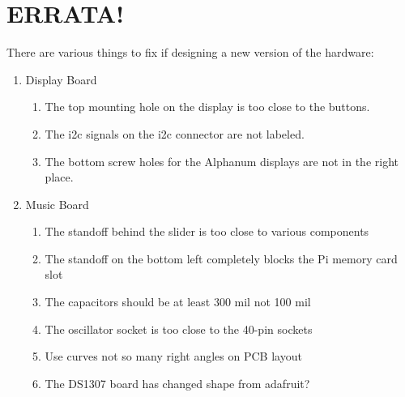 \documentclass[11pt]{article}
\begin{document}
\section{ERRATA!}

There are various things to fix if designing a new version of the
hardware:
\begin{enumerate}
\item Display Board
	\begin{enumerate}
	\item The top mounting hole on the display is too close to the buttons.
	\item The i2c signals on the i2c connector are not labeled.
	\item The bottom screw holes for the Alphanum displays are not in
		the right place.
	\end{enumerate}
\item Music Board
	\begin{enumerate}
	\item The standoff behind the slider is too close to various components
	\item The standoff on the bottom left completely blocks the Pi
		memory card slot
	\item The capacitors should be at least 300 mil not 100 mil
	\item The oscillator socket is too close to the 40-pin sockets
	\item Use curves not so many right angles on PCB layout
	\item The DS1307 board has changed shape from adafruit?
	\end{enumerate}
\end{enumerate}




\end{document}
